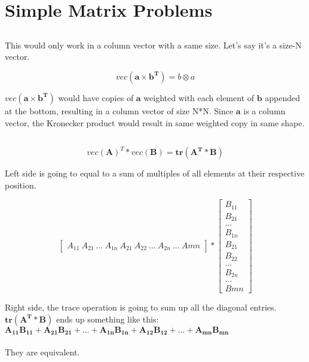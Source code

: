 \documentclass{article}
\newcommand{\matr}[1]{\mathbf{#1}}
\begin{document}
\section{Simple Matrix Problems}
	\subsection{} %
	This would only work in a column vector with a same size. Let's say it's a size-N vector.

	\begin{equation*}
	vec(\matr{a} \times \matr{b^{T}}) = b \otimes a
	\end{equation*}

	$vec(\matr{a} \times \matr{b^{T}})$ would have copies of $\matr{a}$ weighted with each element of $\matr{b}$ appended at the bottom, resulting in       a column vector of size N*N. Since $\matr{a}$ is a column vector, the Kronecker product would result in same weighted copy in same shape.

	\subsection{} %

	\begin{equation*}
	vec(\matr{A})^{T} * vec(\matr{B}) = \matr{tr(\matr{A^{T}}*\matr{B})} 
	\end{equation*}	
	
	Left side is going to equal to a sum of multiples of all elements at their respective position.

	\begin{equation*}
	\begin{bmatrix}
	A_{11} \ A_{21} \ ... \ A_{1n} \ A_{21} \ A_{22}  \ ... \ A_{2n} \ ... \ A{mn}
	\end{bmatrix}
	*
	\begin{bmatrix}
	B_{11} \\ B_{21} \\ ... \\ B_{1n} \\ B_{21} \\ B_{22}  \\ ... \\ B_{2n} \\ ... \\ B{mn}
	\end{bmatrix}
	\end{equation*}

	Right side, the trace operation is going to sum up all the diagonal entries. $\matr{tr(\matr{A^{T}}*\matr{B})}$
	ends up something like this:\\
	$\matr{A_{11}B_{11}} + \matr{A_{21}B_{21}} + ... + \matr{A_{1n}B_{1n}} + \matr{A_{12}B_{12}} + ... + \matr{A_{mn}B_{mn}}$\\
	\\
	They are equivalent.
\end{document}
